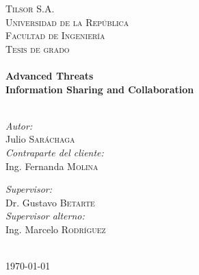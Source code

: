 \pagestyle{empty}
\sffamily

\noindent
\begin{center}
	\textsc{\huge Tilsor S.A.}\\[2.0cm] %
	\textsc{\huge Universidad de la República}\\[1.5cm] %

   \textsc{\LARGE Facultad de Ingeniería}\\[1.5cm] %
   \textsc{\Large Tesis de grado}\\[0.5cm] %
   
   \HRule \\[0.4cm] %
   {\huge \bfseries Advanced Threats \\ \bigskip Information Sharing and Collaboration}\\[0.4cm] %
   \HRule \\[1.5cm] %
   
   \begin{minipage}{0.4\textwidth}
   	\begin{flushleft} \large
   		\emph{Autor:}\\
   		{Julio \textsc{Saráchaga}}\\
   		\bigskip
   		\emph{Contraparte del cliente:}\\
   		{Ing. Fernanda \textsc{Molina}} 
   	\end{flushleft}
   \end{minipage}
   \begin{minipage}{0.4\textwidth}
   	\begin{flushright} \large
   		\emph{Supervisor:} \\
   		{Dr. Gustavo \textsc{Betarte}}\\
   		\bigskip
   		\emph{Supervisor alterno:} \\
   		{Ing. Marcelo \textsc{Rodríguez}}
   	\end{flushright}
   \end{minipage}\\[3cm]
   
   {\large \today}\\[4cm] %
   
   \vfill
\end{center}

\cleardoublepage

\rmfamily
\normalfont

\newpage
\pagestyle{empty}
\mbox{}

